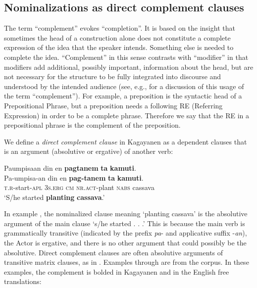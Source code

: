 \subsection{Nominalizations as direct complement clauses}
\label{sec:nominalizationsasdirectcomplementclauses}
The term “complement” evokes “completion”. It is based on the insight that sometimes the head of a construction alone does not constitute a complete expression of the idea that the speaker intends. Something else is needed to complete the idea. “Complement” in this sense contrasts with “modifier” in that modifiers add additional, possibly important, information about the head, but are not necessary for the structure to be fully integrated into discourse and understood by the intended audience (see, e.g., \citealt[219ff]{huddleston2002} for a discussion of this usage of the term “complement”). For example, a preposition is the syntactic head of a Prepositional Phrase, but a preposition needs a following RE (Referring Expression) in order to be a complete phrase. Therefore we say that the RE in a prepositional phrase is the complement of the preposition.

We define a \textit{direct complement clause} in Kagayanen as a dependent clauses that is an argument (absolutive or ergative) of another verb:

\ea
\label{bkm:Ref474213030}
Paumpisaan  din  en  \textbf{pagtanem}  \textbf{ta}  \textbf{kamuti}. \smallskip\\
\gll Pa-umpisa-an  din  en  \textbf{pag-tanem}  \textbf{ta}  \textbf{kamuti}. \\
\textsc{t.r}-start-\textsc{apl}  3\textsc{s.erg}  \textsc{cm}  \textsc{nr.act}-plant  \textsc{nabs}  cassava \\
\glt ‘S/he started \textbf{planting} \textbf{cassava}.’
\z

In example , the nominalized clause meaning ‘planting cassava’ is the absolutive argument of the main clause ‘s/he started . . .’ This is because the main verb is grammatically transitive (indicated by the prefix \textit{pa}- and applicative suffix -\textit{an}), the Actor is ergative, and there is no other argument that could possibly be the absolutive. Direct complement clauses are often absolutive arguments of transitive matrix clauses, as in . Examples  through  are from the corpus. In these examples, the complement is bolded in Kagayanen and in the English free translations:

